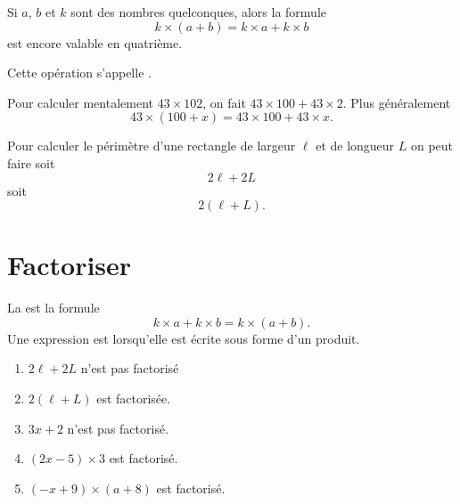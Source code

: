 \begin{Aretenir}
    Si \( a\), \( b\) et \( k\) sont des nombres quelconques, alors la formule
    \begin{equation}
        k\times (a+b)= k\times a+k\times b
    \end{equation}
    est encore valable en quatrième.

    Cette opération s'appelle .
\end{Aretenir}

\begin{example}
    Pour calculer mentalement \( 43\times 102\), on fait \( 43\times 100+43\times 2\). Plus généralement
    \begin{equation}
        43\times (100+x)=43\times 100+43\times x.
    \end{equation}
\end{example}

\begin{example}
    Pour calculer le périmètre d'une rectangle de largeur \( \ell\) et de longueur \( L\) on peut faire soit
    \begin{equation}
        2\ell+2L
    \end{equation}
    soit
    \begin{equation}
        2(\ell+L).
    \end{equation}
\end{example}

\section{Factoriser}

\begin{Aretenir}
    La  est la formule
    \begin{equation}
        k\times a+k\times b=k\times (a+b).
    \end{equation}
    Une expression est  lorsqu'elle est écrite sous forme d'un produit.
\end{Aretenir}

\begin{example}
    \begin{enumerate}
        \item
            \( 2\ell+2L\) n'est pas factorisé
        \item
            \( 2(\ell+L)\) est factorisée.
        \item
            \( 3x+2\) n'est pas factorisé.
        \item
            \( (2x-5)\times 3\) est factorisé.
        \item
            \( (-x+9)\times (a+8)\) est factorisé.
    \end{enumerate}
\end{example}


